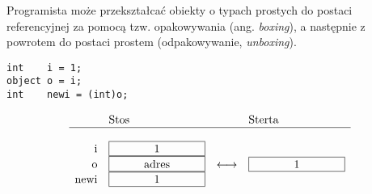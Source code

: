 Programista może przekształcać obiekty o typach prostych do postaci referencyjnej za pomocą
tzw. opakowywania (ang. {\em boxing}), a następnie z powrotem do postaci prostem (odpakowywanie, {\em unboxing}).

\begin{scriptsize}
\begin{verbatim}
int    i = 1;
object o = i;
int    newi = (int)o;
\end{verbatim}
\end{scriptsize}

\begin{center}
$$
\begin{array}{rlll}
            & \mbox{Stos} & & \mbox{Sterta} \\
\hline                                      \\
\mbox{i}    & \framebox[3cm]{1} & & \\
\mbox{o}    & \framebox[3cm]{adres} & \longleftrightarrow & \framebox[3cm]{1} \\
\mbox{newi} & \framebox[3cm]{1} & & \\

\end{array}
$$
\end{center}
